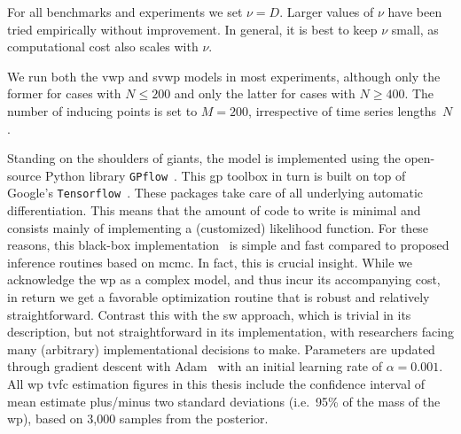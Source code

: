 For all benchmarks and experiments we set $\nu = D$.
Larger values of $\nu$ have been tried empirically without improvement.
In general, it is best to keep $\nu$ small, as computational cost also scales with $\nu$.

We run both the \gls{vwp} and \gls{svwp} models in most experiments, although only the former for cases with $N \leq 200$ and only the latter for cases with $N \geq 400$.
The number of inducing points is set to $M = 200$, irrespective of time series lengths~$N$.

Standing on the shoulders of giants, the model is implemented using the open-source Python library \texttt{GPflow}~\parencite[][version 2.5.2]{Matthews2017, Wilk2020}.
This \gls{gp} toolbox in turn is built on top of Google's \texttt{Tensorflow}~\parencite[][version 2.9.2]{Tensorflow2015}.
These packages take care of all underlying automatic differentiation.
This means that the amount of code to write is minimal and consists mainly of implementing a (customized) likelihood function.
For these reasons, this black-box implementation~\parencite{Ranganath2014} is simple and fast compared to proposed inference routines based on \gls{mcmc}.
%
In fact, this is crucial insight.
While we acknowledge the \gls{wp} as a complex model, and thus incur its accompanying cost, in return we get a favorable optimization routine that is robust and relatively straightforward.
Contrast this with the \gls{sw} approach, which is trivial in its description, but not straightforward in its implementation, with researchers facing many (arbitrary) implementational decisions to make.
Parameters are updated through gradient descent with Adam~\parencite{Kingma2015} with an initial learning rate of $\alpha = 0.001$.
All \gls{wp} \gls{tvfc} estimation figures in this thesis include the confidence interval of mean estimate plus/minus two standard deviations (i.e.~95\% of the mass of the \gls{wp}), based on 3,000 samples from the posterior.
